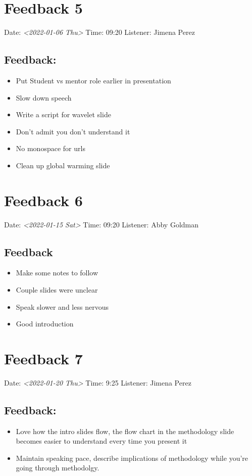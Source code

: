 \documentclass[little]{basic}
\begin{document}
\section{Feedback 5}
\label{sec:org71846e3}

Date: \textit{<2022-01-06 Thu>}
Time: 09:20
Listener: Jimena Perez
\subsection*{Feedback:}
\label{sec:orga0d61f9}
\begin{itemize}
\item Put Student vs mentor role earlier in presentation
\item Slow down speech
\item Write a script for wavelet slide
\item Don't admit you don't understand it
\item No monospace for urls
\item Clean up global warming slide
\end{itemize}

\section{Feedback 6}
\label{sec:orge523970}

Date: \textit{<2022-01-15 Sat>}
Time: 09:20
Listener: Abby Goldman
\subsection*{Feedback}
\label{sec:org2833856}
\begin{itemize}
\item Make some notes to follow
\item Couple slides were unclear
\item Speak slower and less nervous
\item Good introduction
\end{itemize}

\section{Feedback 7}
\label{sec:org3149d17}
Date: \textit{<2022-01-20 Thu>}
Time: 9:25
Listener: Jimena Perez
\subsection*{Feedback:}
\label{sec:org43a5e7b}
\begin{itemize}
\item Love how the intro slides flow, the flow chart in the methodology slide becomes easier to understand every time you present it
\item Maintain speaking pace, describe implications of methodology while you're going through methodolgy.
\end{itemize}
\end{document}
